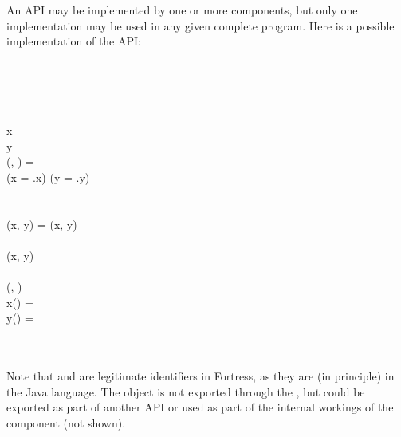An API may be implemented by one or more components, but only one implementation
may be used in any given complete program.  Here is a possible implementation of
the  API:
\begin{codeexamplesize}
\begin{FortressCode}
  \\
  \\
 \\
  \\
\2\+x\COLON {} \\
  y\COLON {} \\
  (, \COLON {})\COLON {} = \\
  \2\+(x = .x) \wedge (y = .y)\-\- \\
 \\
 \\
(x\COLON {}, y\COLON {}) = (x, y) \\
 \\
 (x\COLON {}, y\COLON {})  \\
 \\
 (\rho\COLON {}, \theta\COLON {}) \\
\2\+ x(\ultrathin) = \rho\, \cos\, \theta \\
   y(\ultrathin) = \rho\, \sin\, \theta\- \\
 \\
 \\
 
\end{FortressCode}
\end{codeexamplesize}
Note that \EXP{\rho} and \EXP{\theta} are legitimate identifiers in Fortress,
as they are (in principle) in the Java language.  The object
 is not exported through the , but could be
exported as part of another API or used as part of the internal
workings of the component (not shown).


